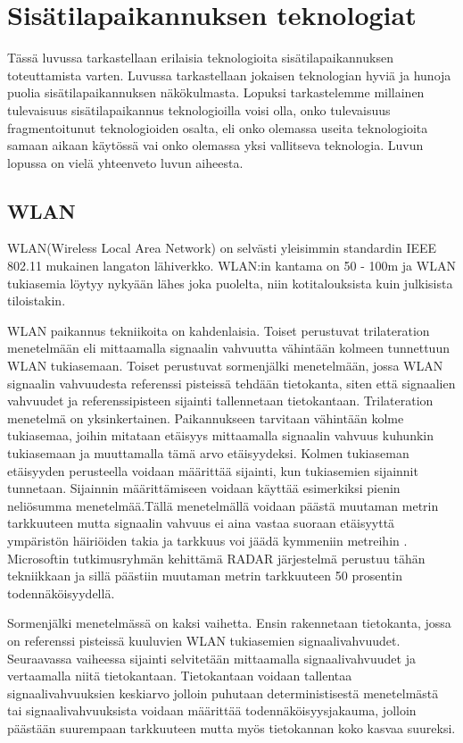 	\section{Sisätilapaikannuksen teknologiat}
Tässä luvussa tarkastellaan erilaisia teknologioita sisätilapaikannuksen toteuttamista varten. Luvussa tarkastellaan jokaisen teknologian hyviä ja hunoja puolia sisätilapaikannuksen näkökulmasta. Lopuksi tarkastelemme millainen tulevaisuus sisätilapaikannus teknologioilla voisi olla, onko tulevaisuus fragmentoitunut teknologioiden osalta, eli onko olemassa useita teknologioita samaan aikaan käytössä vai onko olemassa yksi vallitseva teknologia. Luvun lopussa on vielä yhteenveto luvun aiheesta.
\subsection{WLAN}
WLAN(Wireless Local Area Network) on selvästi yleisimmin standardin IEEE 802.11 mukainen langaton lähiverkko\cite{A}. WLAN:in kantama on 50 - 100m ja WLAN tukiasemia löytyy nykyään lähes joka puolelta, niin kotitalouksista kuin julkisista tiloistakin.

WLAN paikannus tekniikoita on kahdenlaisia. Toiset perustuvat trilateration menetelmään eli mittaamalla signaalin vahvuutta vähintään kolmeen tunnettuun WLAN tukiasemaan. Toiset perustuvat sormenjälki menetelmään, jossa WLAN signaalin vahvuudesta referenssi pisteissä tehdään tietokanta, siten että signaalien vahvuudet ja referenssipisteen sijainti tallennetaan tietokantaan.\cite{G}
Trilateration menetelmä on yksinkertainen. Paikannukseen tarvitaan vähintään kolme tukiasemaa, joihin mitataan etäisyys mittaamalla signaalin vahvuus kuhunkin tukiasemaan ja muuttamalla tämä arvo etäisyydeksi. Kolmen tukiaseman etäisyyden perusteella voidaan määrittää sijainti, kun tukiasemien sijainnit tunnetaan. Sijainnin määrittämiseen voidaan käyttää esimerkiksi pienin neliösumma menetelmää.\cite{G}Tällä menetelmällä voidaan päästä muutaman metrin tarkkuuteen\cite{G} mutta signaalin vahvuus ei aina vastaa suoraan etäisyyttä ympäristön häiriöiden takia ja tarkkuus voi jäädä kymmeniin metreihin \cite{A}. Microsoftin tutkimusryhmän kehittämä RADAR\cite{H} järjestelmä perustuu tähän tekniikkaan ja sillä päästiin muutaman metrin tarkkuuteen 50 prosentin todennäköisyydellä.

Sormenjälki menetelmässä on kaksi vaihetta\cite{G}. Ensin rakennetaan tietokanta, jossa on referenssi pisteissä kuuluvien WLAN tukiasemien signaalivahvuudet. Seuraavassa vaiheessa sijainti selvitetään mittaamalla signaalivahvuudet ja vertaamalla niitä tietokantaan. Tietokantaan voidaan tallentaa signaalivahvuuksien keskiarvo jolloin puhutaan deterministisestä menetelmästä tai signaalivahvuuksista voidaan määrittää todennäköisyysjakauma, jolloin päästään suurempaan tarkkuuteen mutta myös tietokannan koko kasvaa suureksi.\cite{G}

